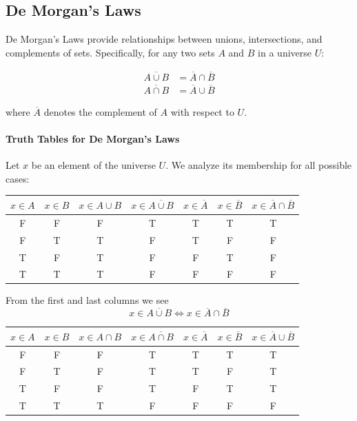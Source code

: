 \documentclass[11pt]{article}
\begin{document}
    \subsection{De Morgan's Laws}
    \label{subsec:de-morgan}

    De Morgan's Laws provide relationships between unions, intersections, and complements of sets.
    Specifically, for any two sets $A$ and $B$ in a universe $U$:

    \begin{align*}
        \overline{A \cup B} &= \overline{A} \cap \overline{B} \\
        \overline{A \cap B} &= \overline{A} \cup \overline{B}
    \end{align*}

    where $\overline{A}$ denotes the complement of $A$ with respect to $U$.

    \paragraph{Truth Tables for De Morgan's Laws}

    Let $x$ be an element of the universe $U$.
    We analyze its membership for all possible cases:

    \begin{center}
    \begin{tabular}{|c|c||c|c|c|c|c|}
        \hline
        $x \in A$ & $x \in B$ & $x \in A \cup B$ & $x \in \overline{A \cup B}$ & $x \in \overline{A}$ & $x \in \overline{B}$ & $x \in \overline{A} \cap \overline{B}$ \\
        \hline
        F & F & F & T & T & T & T \\
        F & T & T & F & T & F & F \\
        T & F & T & F & F & T & F \\
        T & T & T & F & F & F & F \\
        \hline
    \end{tabular}
    \end{center}

    From the first and last columns we see
    \[
    x \in \overline{A \cup B} \iff x \in \overline{A} \cap \overline{B}
    \]

    \vspace{0.5cm}

    \begin{center}
    \begin{tabular}{|c|c||c|c|c|c|c|}
        \hline
        $x \in A$ & $x \in B$ & $x \in A \cap B$ & $x \in \overline{A \cap B}$ & $x \in \overline{A}$ & $x \in \overline{B}$ & $x \in \overline{A} \cup \overline{B}$ \\
        \hline
        F & F & F & T & T & T & T \\
        F & T & F & T & T & F & T \\
        T & F & F & T & F & T & T \\
        T & T & T & F & F & F & F \\
        \hline
    \end{tabular}
    \end{center}
\end{document}
